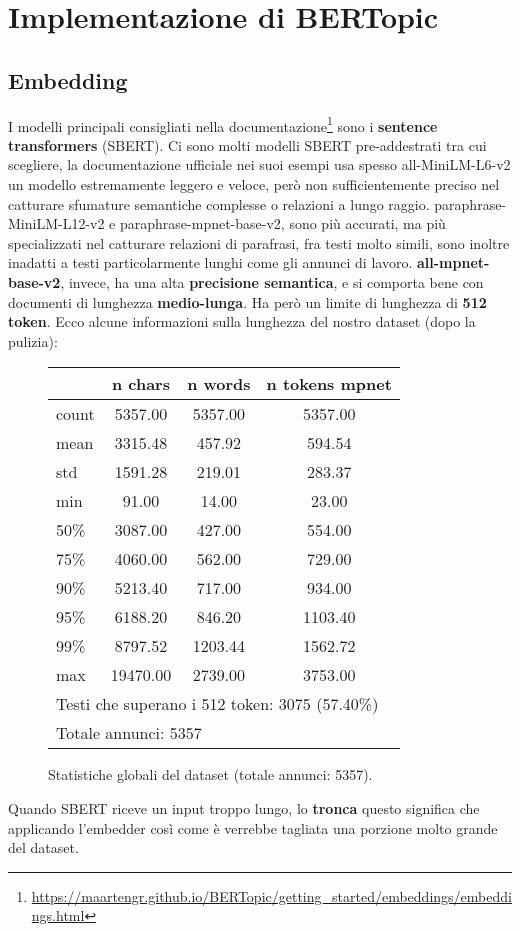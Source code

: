 \chapter{Implementazione di BERTopic}

\section{Embedding}
I modelli principali consigliati nella documentazione\footnote{\url{https://maartengr.github.io/BERTopic/getting_started/embeddings/embeddings.html}} sono i \textbf{sentence transformers} (SBERT).
Ci sono molti modelli SBERT pre-addestrati tra cui scegliere, la documentazione ufficiale nei suoi esempi usa spesso all-MiniLM-L6-v2 un modello estremamente leggero e veloce, però non sufficientemente preciso nel catturare sfumature semantiche complesse o relazioni a lungo raggio.
paraphrase-MiniLM-L12-v2 e paraphrase-mpnet-base-v2, sono più accurati, ma più specializzati nel catturare relazioni di parafrasi, fra testi molto simili, sono inoltre inadatti a testi particolarmente lunghi come gli annunci di lavoro.
\textbf{all-mpnet-base-v2}, invece, ha una alta \textbf{precisione semantica}, e si comporta bene con documenti di lunghezza \textbf{medio-lunga}.
Ha però un limite di lunghezza di \textbf{512 token}.
Ecco alcune informazioni sulla lunghezza del nostro dataset (dopo la pulizia):
\begin{figure}[H]
\centering
\scriptsize
\begin{tabular}{lccc}
\hline
 & n chars & n words & n tokens mpnet \\
\hline
count & 5357.00 & 5357.00 & 5357.00 \\
mean & 3315.48 & 457.92 & 594.54 \\
std & 1591.28 & 219.01 & 283.37 \\
min & 91.00 & 14.00 & 23.00 \\
50\% & 3087.00 & 427.00 & 554.00 \\
75\% & 4060.00 & 562.00 & 729.00 \\
90\% & 5213.40 & 717.00 & 934.00 \\
95\% & 6188.20 & 846.20 & 1103.40 \\
99\% & 8797.52 & 1203.44 & 1562.72 \\
max & 19470.00 & 2739.00 & 3753.00 \\
\hline
\multicolumn{4}{l}{Testi che superano i 512 token: 3075 (57.40\%)} \\
\multicolumn{4}{l}{Totale annunci: 5357} \\
\hline
\end{tabular}
\caption{Statistiche globali del dataset (totale annunci: 5357).}
\label{fig:dataset-stats}
\end{figure}
\noindent Quando SBERT riceve un input troppo lungo, lo \textbf{tronca} questo significa che applicando l'embedder così come è verrebbe tagliata una porzione molto grande del dataset.

